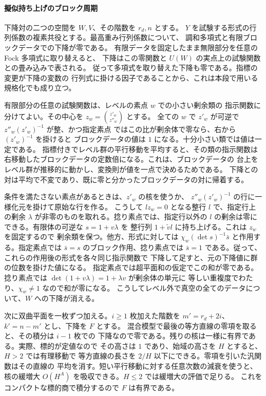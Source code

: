 \paragraph{擬似持ち上げのブロック周期}\label{par:false-lift-periods}
下降対の二つの空間を \(W,V\)、その階数を \(r_d,n\) とする。
\(Y\) を試験する形式の行列係数の複素共役とする。最高重み行列係数について、
調和多項式と有限ブロックデータでの下降が零である。
有限データを固定したまま無限部分を任意の Fock 多項式に取り替えると、
下降はこの零関数と \(U(W)\) の実点上の試験関数との畳み込みで表される。
従って多項式を取り替えた下降も零である。指標の変更が下降の変数の
行列式に掛ける因子であることから、これは本段で用いる規格化でも成り立つ。

有限部分の任意の試験関数は、レベルの素点 \(w\) での小さい剰余類の
指示関数に分けてよい。その中心を \(z_w=\binom{z'_w}{z''_w}\) とする。
全ての \(w\) で \(z'_w\) が可逆で \(z''_w(z'_w)^{-1}\) が整、かつ指定素点
ではこの比が剰余体で零なら、右から \((z'_w)^{-1}\) を掛けると
ブロックデータの値は \(1\) になる。十分小さい類では値は一定である。
指標付きでレベル群の平行移動を平均すると、その類の指示関数は
右移動したブロックデータの定数倍になる。これは、ブロックデータの
台上をレベル群が推移的に動かし、変換則が値を一点で決めるためである。
下降との対は平均で不変であり、既に零と分かったブロックデータの対に帰着する。

条件を満たさない素点があるときは、\(z'_w\) の核を使うか、
\(z''_w(z'_w)^{-1}\) の行に一様化元を掛けて原始な行を作る。
こうして \(lz_w=0\) となる整行 \(l\) で、指定行上の剰余
\(\lambda\) が非零のものを取れる。捻り素点では、指定行以外の
\(l\) の剰余は零にできる。有限体の可逆な \(s=1+v\lambda\) を
整行列 \(1+\widetilde v l\) に持ち上げる。これは \(z_w\) を固定するので
剰余類を保つ。他方、形式に対しては \(\chi_w(\det s)^{-1}\bar s\)
と作用する。指定素点では \(\bar s=s\) のブロック作用、捻り素点では
\(\bar s=1\) である。従って、これらの作用後の形式を各々同じ指示関数で
下降して足すと、元の下降値に群の位数を掛けた値になる。
指定素点では超平面和の仮定でこの和が零である。
捻り素点では \(\det(1+v\lambda)=1+\lambda v\) が剰余体の単元に
等しい重複度でわたり、\(\chi_w\ne1\) なので和が零になる。
こうしてレベル外で真空の全てのデータについて、\(W\) への下降が消える。

次に双曲平面を一枚ずつ加える。\(i\ge1\) 枚加えた階数を
\(m'=r_d+2i\)、\(k'=n-m'\) とし、下降を \(F\) とする。
混合模型で最後の等方直線の零項を取ると、その積分は \(i-1\) 枚での
下降なので零である。残りの核は一様に有界である。実際、標的が定値なので
その高さは \(1\) であり、始域の高さを \(H\) とすると、\(H>2\) では有理移動で
等方直線の長さを \(2/H\) 以下にできる。零項を引いた汎関数はその直線の
平均を消す。短い平行移動に対する任意次数の減衰を使うと、核の緩増大
\(O(H^A)\) を吸収できる。\(H\le2\) では緩増大の評価で足りる。
これをコンパクトな標的商で積分するので \(F\) は有界である。

